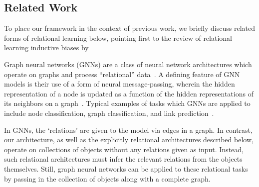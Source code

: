 \subsection{Related Work}\label{ssec:related_work}

To place our framework in the context of previous work, we briefly discuss related forms of relational learning below, pointing first to the review of relational learning inductive biases by~\cite{battagliaRelationalInductiveBiases2018}%

{Graph neural networks} (GNNs) are a class of neural network architectures which operate on graphs and process ``relational'' data~\citep[e.g.,][]{niepertLearningConvolutionalNeural2016,kipfSemiSupervisedClassificationGraph2017,schlichtkrullModelingRelationalData2017,velickovicGraphAttentionNetworks2017,kipfNeuralRelationalInference2018,xuHowPowerfulAre2018}. A defining feature of GNN models is their use of a form of neural message-passing, wherein the hidden representation of a node is updated as a function of the hidden representations of its neighbors on a graph~\cite{gilmerNeuralMessagePassing2017}. Typical examples of tasks which GNNs are applied to include node classification, graph classification, and link prediction~\cite{hamiltonGraphRepresentationLearning2020}. %

In GNNs, the `relations' are given to the model via edges in a graph. In contrast, our architecture, as well as the explicitly relational architectures described below, operate on collections of objects without any relations given as input. Instead, such relational architectures must infer the relevant relations from the objects themselves. Still, graph neural networks can be applied to these relational tasks by passing in the collection of objects along with a complete graph. %

